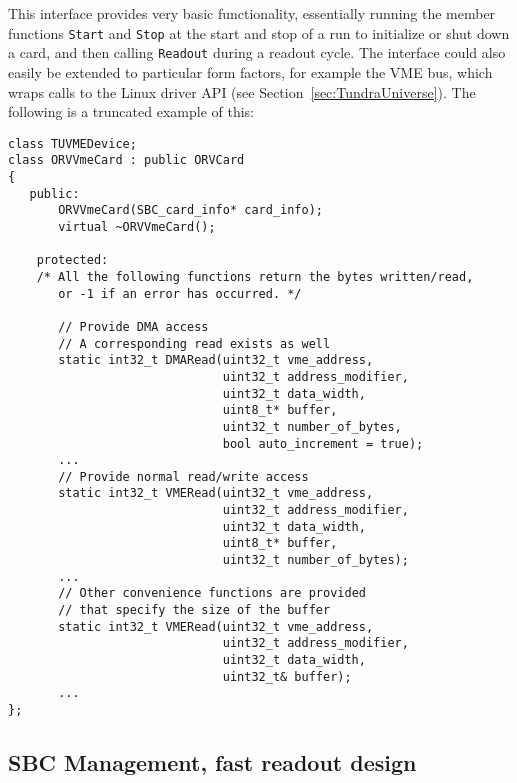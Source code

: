 This interface provides very basic functionality, essentially running the member functions \lstinline!Start! and \lstinline!Stop!
at the start and stop of a run to initialize or shut down a card, and then calling \lstinline!Readout! during a readout cycle.  
The interface could also easily be extended to particular form factors, for example the VME bus, which wraps calls to the Linux
driver API (see Section~\ref{sec:TundraUniverse}).  The following is a truncated example of this:
			\begin{lstlisting}
class TUVMEDevice;
class ORVVmeCard : public ORVCard 
{
   public:
       ORVVmeCard(SBC_card_info* card_info);
       virtual ~ORVVmeCard(); 

    protected:
	/* All the following functions return the bytes written/read,
	   or -1 if an error has occurred. */
	
       // Provide DMA access
       // A corresponding read exists as well 
       static int32_t DMARead(uint32_t vme_address,
                              uint32_t address_modifier,
                              uint32_t data_width,
                              uint8_t* buffer,
                              uint32_t number_of_bytes,
                              bool auto_increment = true);
       ...
       // Provide normal read/write access 
       static int32_t VMERead(uint32_t vme_address,
                              uint32_t address_modifier,
                              uint32_t data_width,
                              uint8_t* buffer,
                              uint32_t number_of_bytes);
       ...
       // Other convenience functions are provided
       // that specify the size of the buffer
       static int32_t VMERead(uint32_t vme_address,
                              uint32_t address_modifier,
                              uint32_t data_width,
                              uint32_t& buffer);
       ...
};
			\end{lstlisting}

		\subsection{SBC Management, fast readout design}	

